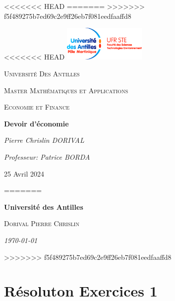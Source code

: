 \documentclass[11pt,twoside,a4paper]{article}
\begin{document}
<<<<<<< HEAD
=======
\tableofcontents %
>>>>>>> f5f489275b7ed69c2e9ff26eb7f081eedfaaffd8

\begin{titlepage}
    \centering
<<<<<<< HEAD
    \vspace*{1cm}
    \includegraphics[width=4cm]{logo.jpg} %
    \vfill
    {\scshape\Large Université Des Antilles \par} %
    \vspace{1cm}
    {\scshape\Large Master Mathématiques et Applications  \par} %
    {\scshape\Large Economie et Finance  \par}
    \vspace{3cm}
    {\huge\bfseries Devoir d'économie\par}
    \vspace{1cm}
    {\Large\itshape Pierre Chrislin DORIVAL\par} %
    \vspace{0.5cm}
    {\Large\itshape Professeur: Patrice BORDA\par} %
    \vfill
    {\large 25 Avril  2024 \par} %
=======
    {\LARGE\bfseries Université des Antilles\par}
    \vspace{2cm}
    {\scshape\Large Dorival Pierre Chrislin\par}
    \vspace{2cm}
    {\large\itshape\today\par}
>>>>>>> f5f489275b7ed69c2e9ff26eb7f081eedfaaffd8
\end{titlepage}

\section*{Résoluton Exercices 1}
\end{document}
